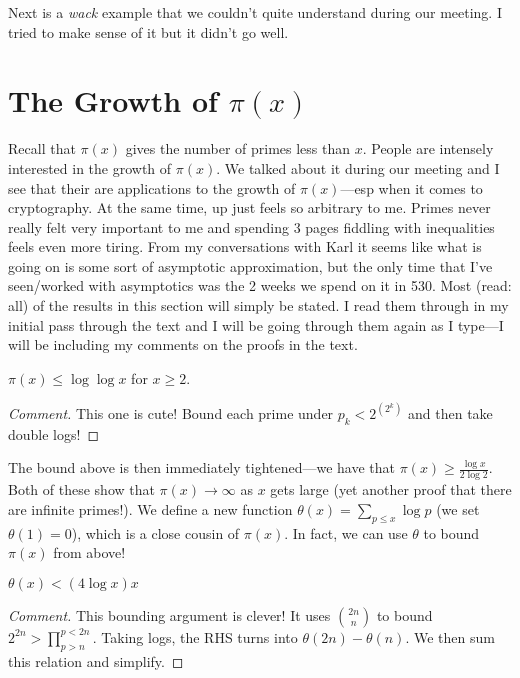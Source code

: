 Next is a \emph{wack} example that we couldn't quite understand during our
meeting. I tried to make sense of it but it didn't go well.

\section{The Growth of \(\pi(x)\)}%
\label{sec:growpix}

Recall that \(\pi(x)\) gives the number of primes less than \(x\). People are
intensely interested in the growth of \(\pi(x)\). We talked about it during our
meeting and I see that their are applications to the growth of \(\pi(x)\)---esp
when it comes to cryptography. At the same time, up just feels so arbitrary to
me. Primes never really felt very important to me and spending 3 pages fiddling
with inequalities feels even more tiring. From my conversations with Karl it
seems like what is going on is some sort of asymptotic approximation, but the
only time that I've seen/worked with asymptotics was the 2 weeks we spend on it
in 530. Most (read: all) of the results in this section will simply be stated. I
read them through in my initial pass through the text and I will be going
through them again as I type---I will be including my comments on the proofs in
the text.

\begin{prop}
  \(\pi(x) \leq \log \log x\) for \(x\geq 2\).
\end{prop}

\begin{proof}[Comment]
  This one is cute! Bound each prime under \(p_k < 2^{(2^k)}\) and then take
  double logs!
\end{proof}

The bound above is then immediately tightened---we have that
\(\pi(x)\geq \frac{\log x}{2 \log 2}\). Both of these show that
\(\pi(x)\to \infty\) as \(x\) gets large (yet another proof that there are
infinite primes!). We define a new function
\(\theta(x) = \sum_{p\leq x} \log p\) (we set \(\theta(1)=0\)), which is a close
cousin of \(\pi(x)\). In fact, we can use \(\theta\) to bound \(\pi(x)\) from
above!

\begin{prop}
  \(\theta(x) < (4\log x)x\)
\end{prop}

\begin{proof}[Comment]
  This bounding argument is clever! It uses \(\binom{2n}{n}\) to bound
  \(2^{2n}>\prod_{p>n}^{p<2n}\). Taking logs, the RHS turns into
  \(\theta(2n)-\theta(n)\). We then sum this relation and simplify.
\end{proof}

